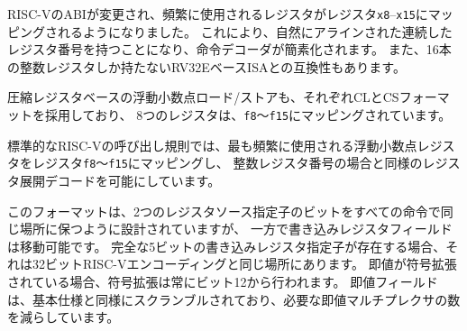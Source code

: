 \begin{commentary}
\begin{comment}
The RISC-V ABI was changed to make the frequently used registers map
to registers {\tt x8}--{\tt x15}.  This simplifies the decompression
decoder by having a contiguous naturally aligned set of register
numbers, and is also compatible with the RV32E base ISA,
which only has 16 integer registers.
\end{comment}
RISC-VのABIが変更され、頻繁に使用されるレジスタがレジスタ{\tt x8}--{\tt x15}にマッピングされるようになりました。
これにより、自然にアラインされた連続したレジスタ番号を持つことになり、命令デコーダが簡素化されます。
また、16本の整数レジスタしか持たないRV32EベースISAとの互換性もあります。
\end{commentary}

\begin{comment}
Compressed register-based floating-point loads and stores also use the
CL and CS formats respectively, with the eight registers mapping to
{\tt f8} to {\tt f15}.
\end{comment}

圧縮レジスタベースの浮動小数点ロード/ストアも、それぞれCLとCSフォーマットを採用しており、
8つのレジスタは、{\tt f8}～{\tt f15}にマッピングされています。

\begin{commentary}
\begin{comment}
The standard RISC-V calling convention maps the most frequently used
floating-point registers to registers {\tt f8} to {\tt f15}, which
allows the same register decompression decoding as for integer
register numbers.
\end{comment}
標準的なRISC-Vの呼び出し規則では、最も頻繁に使用される浮動小数点レジスタをレジスタ{\tt f8}～{\tt f15}にマッピングし、
整数レジスタ番号の場合と同様のレジスタ展開デコードを可能にしています。
\end{commentary}

\begin{comment}
The formats were designed to keep bits for the two register source
specifiers in the same place in all instructions, while the
destination register field can move.  When the full 5-bit destination
register specifier is present, it is in the same place as in the
32-bit RISC-V encoding.  Where immediates are
sign-extended, the sign-extension is always from bit 12.  Immediate
fields have been scrambled, as in the base specification, to reduce
the number of immediate muxes required.
\end{comment}
このフォーマットは、2つのレジスタソース指定子のビットをすべての命令で同じ場所に保つように設計されていますが、
一方で書き込みレジスタフィールドは移動可能です。
完全な5ビットの書き込みレジスタ指定子が存在する場合、それは32ビットRISC-Vエンコーディングと同じ場所にあります。
即値が符号拡張されている場合、符号拡張は常にビット12から行われます。
即値フィールドは、基本仕様と同様にスクランブルされており、必要な即値マルチプレクサの数を減らしています。


